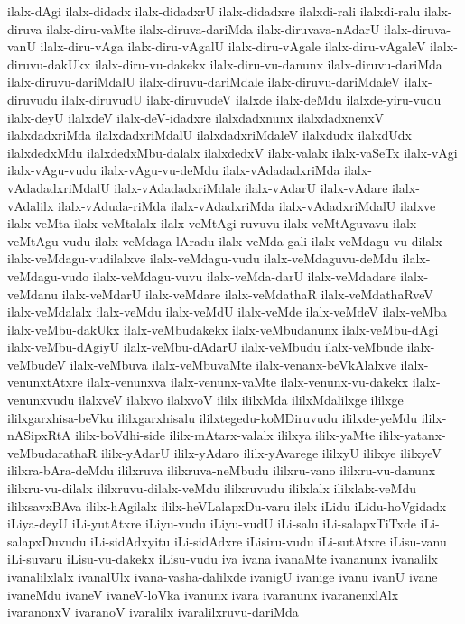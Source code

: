 {ilalx-dAgi
ilalx-didadx
ilalx-didadxrU
ilalx-didadxre
ilalxdi-rali
ilalxdi-ralu
ilalx-diruva
ilalx-diru-vaMte
ilalx-diruva-dariMda
ilalx-diruvava-nAdarU
ilalx-diruva-vanU
ilalx-diru-vAga
ilalx-diru-vAgalU
ilalx-diru-vAgale
ilalx-diru-vAgaleV
ilalx-diruvu-dakUkx
ilalx-diru-vu-dakekx
ilalx-diru-vu-danunx
ilalx-diruvu-dariMda
ilalx-diruvu-dariMdalU
ilalx-diruvu-dariMdale
ilalx-diruvu-dariMdaleV
ilalx-diruvudu
ilalx-diruvudU
ilalx-diruvudeV
ilalxde
ilalx-deMdu
ilalxde-yiru-vudu
ilalx-deyU
ilalxdeV
ilalx-deV-idadxre
ilalxdadxnunx
ilalxdadxnenxV
ilalxdadxriMda
ilalxdadxriMdalU
ilalxdadxriMdaleV
ilalxdudx
ilalxdUdx
ilalxdedxMdu
ilalxdedxMbu-dalalx
ilalxdedxV
ilalx-valalx
ilalx-vaSeTx
ilalx-vAgi
ilalx-vAgu-vudu
ilalx-vAgu-vu-deMdu
ilalx-vAdadadxriMda
ilalx-vAdadadxriMdalU
ilalx-vAdadadxriMdale
ilalx-vAdarU
ilalx-vAdare
ilalx-vAdalilx
ilalx-vAduda-riMda
ilalx-vAdadxriMda
ilalx-vAdadxriMdalU
ilalxve
ilalx-veMta
ilalx-veMtalalx
ilalx-veMtAgi-ruvuvu
ilalx-veMtAguvavu
ilalx-veMtAgu-vudu
ilalx-veMdaga-lAradu
ilalx-veMda-gali
ilalx-veMdagu-vu-dilalx
ilalx-veMdagu-vudilalxve
ilalx-veMdagu-vudu
ilalx-veMdaguvu-deMdu
ilalx-veMdagu-vudo
ilalx-veMdagu-vuvu
ilalx-veMda-darU
ilalx-veMdadare
ilalx-veMdanu
ilalx-veMdarU
ilalx-veMdare
ilalx-veMdathaR
ilalx-veMdathaRveV
ilalx-veMdalalx
ilalx-veMdu
ilalx-veMdU
ilalx-veMde
ilalx-veMdeV
ilalx-veMba
ilalx-veMbu-dakUkx
ilalx-veMbudakekx
ilalx-veMbudanunx
ilalx-veMbu-dAgi
ilalx-veMbu-dAgiyU
ilalx-veMbu-dAdarU
ilalx-veMbudu
ilalx-veMbude
ilalx-veMbudeV
ilalx-veMbuva
ilalx-veMbuvaMte
ilalx-venanx-beVkAlalxve
ilalx-venunxtAtxre
ilalx-venunxva
ilalx-venunx-vaMte
ilalx-venunx-vu-dakekx
ilalx-venunxvudu
ilalxveV
ilalxvo
ilalxvoV
ililx
ililxMda
ililxMdalilxge
ililxge
ililxgarxhisa-beVku
ililxgarxhisalu
ililxtegedu-koMDiruvudu
ililxde-yeMdu
ililx-nASipxRtA
ililx-boVdhi-side
ililx-mAtarx-valalx
ililxya
ililx-yaMte
ililx-yatanx-veMbudarathaR
ililx-yAdarU
ililx-yAdaro
ililx-yAvarege
ililxyU
ililxye
ililxyeV
ililxra-bAra-deMdu
ililxruva
ililxruva-neMbudu
ililxru-vano
ililxru-vu-danunx
ililxru-vu-dilalx
ililxruvu-dilalx-veMdu
ililxruvudu
ililxlalx
ililxlalx-veMdu
ililxsavxBAva
ililx-hAgilalx
ililx-heVLalapxDu-varu
ilelx
iLidu
iLidu-hoVgidadx
iLiya-deyU
iLi-yutAtxre
iLiyu-vudu
iLiyu-vudU
iLi-salu
iLi-salapxTiTxde
iLi-salapxDuvudu
iLi-sidAdxyitu
iLi-sidAdxre
iLisiru-vudu
iLi-sutAtxre
iLisu-vanu
iLi-suvaru
iLisu-vu-dakekx
iLisu-vudu
iva
ivana
ivanaMte
ivananunx
ivanalilx
ivanalilxlalx
ivanalUlx
ivana-vasha-dalilxde
ivanigU
ivanige
ivanu
ivanU
ivane
ivaneMdu
ivaneV
ivaneV-loVka
ivanunx
ivara
ivaranunx
ivaranenxlAlx
ivaranonxV
ivaranoV
ivaralilx
ivaralilxruvu-dariMda
}
